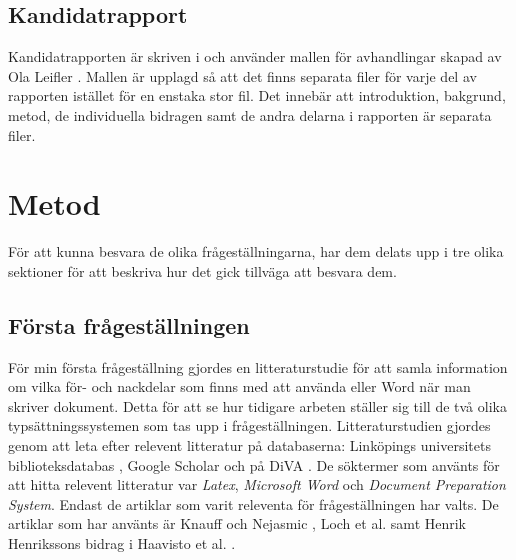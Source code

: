 \subsection{Kandidatrapport}
\label{sec:thesis-info-tuhkala}
Kandidatrapporten är skriven i \latex och använder mallen för avhandlingar skapad av Ola Leifler \cite{thesis_template}. Mallen är upplagd så att det finns separata filer för varje del av rapporten istället för en enstaka stor fil. Det innebär att introduktion, bakgrund, metod, de individuella bidragen samt de andra delarna i rapporten är separata filer.

\section{Metod}
\label{sec:method-tuhkala}
För att kunna besvara de olika frågeställningarna, har dem delats upp i tre olika sektioner för att beskriva hur det gick tillväga att besvara dem.

\subsection{Första frågeställningen}
För min första frågeställning gjordes en litteraturstudie för att samla information om vilka för- och nackdelar som finns med att använda \latex eller Word när man skriver dokument. Detta för att se hur tidigare arbeten ställer sig till de två olika typsättningssystemen som tas upp i frågeställningen. Litteraturstudien gjordes genom att leta efter relevent litteratur på databaserna: Linköpings universitets biblioteksdatabas \cite{liu_bibliotek}, Google Scholar \cite{google_scholar} och på DiVA \cite{diva_portal}. De söktermer som använts för att hitta relevent litteratur var \textit{Latex}, \textit{Microsoft Word} och \textit{Document Preparation System}. Endast de artiklar som varit releventa för frågeställningen har valts. De artiklar som har använts är Knauff och Nejasmic \cite{knauff2014efficiency}, Loch et al. \cite{loch2014master} samt Henrik Henrikssons bidrag i Haavisto et al. \cite{Haavisto954095}.

